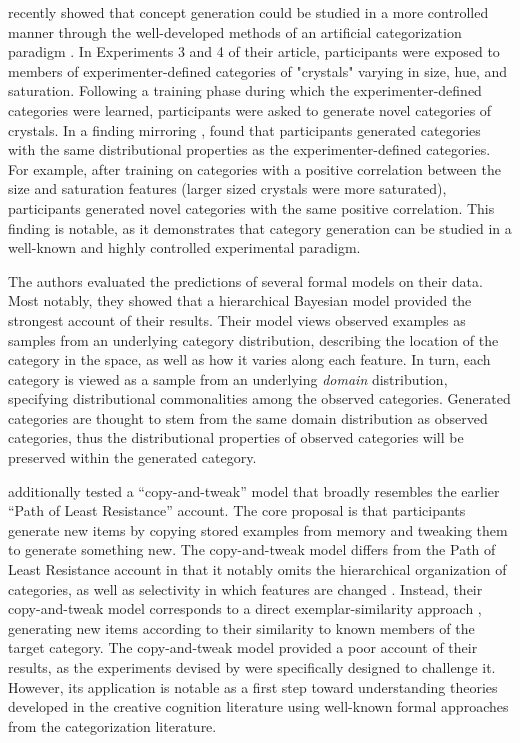 \documentclass[12pt]{article}
\begin{document}
\begin{flushleft}
\cite{jern2013probabilistic} recently showed that concept generation could be studied in a more controlled manner through the well-developed methods of an artificial categorization paradigm \citep[see][for a review]{kurtz2015human}. In Experiments 3 and 4 of their article, participants were exposed to members of experimenter-defined categories of "crystals" varying in size, hue, and saturation. Following a training phase during which the experimenter-defined categories were learned, participants were asked to generate novel categories of crystals. In a finding mirroring \cite{ward1994structured}, \cite{jern2013probabilistic} found that participants generated categories with the same distributional properties as the experimenter-defined categories. For example, after training on categories with a positive correlation between the size and saturation features (larger sized crystals were more saturated), participants generated novel categories with the same positive correlation. This finding is notable, as it demonstrates that category generation can be studied in a well-known and highly controlled experimental paradigm. 

The authors evaluated the predictions of several formal models on their data. Most notably, they showed that a hierarchical Bayesian model provided the strongest account of their results. Their model views observed examples as samples from an underlying category distribution, describing the location of the category in the space, as well as how it varies along each feature. In turn, each category is viewed as a sample from an underlying {\em domain} distribution, specifying distributional commonalities among the observed categories. Generated categories are thought to stem from the same domain distribution as observed categories, thus the distributional properties of observed categories will be preserved within the generated category.

\cite{jern2013probabilistic} additionally tested a ``copy-and-tweak'' model that broadly resembles the earlier ``Path of Least Resistance'' account. The core proposal is that participants generate new items by copying stored examples from memory and tweaking them to generate something new. The copy-and-tweak model differs from the Path of Least Resistance account in that it notably omits the hierarchical organization of categories, as well as selectivity in which features are changed \citep[both of which are factors in the Path of Least Resistance account;][]{ward2002role}. Instead, their copy-and-tweak model corresponds to a direct exemplar-similarity approach \citep[e.g.,][]{nosofsky1984choice,nosofsky1986attention}, generating new items according to their similarity to known members of the target category. The copy-and-tweak model provided a poor account of their results, as the experiments devised by \citeauthor{jern2013probabilistic} were specifically designed to challenge it. However, its application is notable as a first step toward understanding theories developed in the creative cognition literature using well-known formal approaches from the categorization literature.



\end{flushleft}
\end{document}
